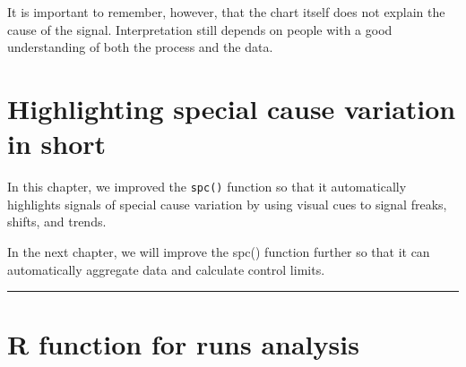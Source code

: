 \documentclass[
]{book}
\begin{document}
It is important to remember, however, that the chart itself does not
explain the cause of the signal. Interpretation still depends on people
with a good understanding of both the process and the data.

\section{Highlighting special cause variation in
short}\label{highlighting-special-cause-variation-in-short}

In this chapter, we improved the \texttt{spc()} function so that it
automatically highlights signals of special cause variation by using
visual cues to signal freaks, shifts, and trends.

In the next chapter, we will improve the spc() function further so that
it can automatically aggregate data and calculate control limits.

\begin{center}\rule{0.5\linewidth}{0.5pt}\end{center}

\section*{R function for runs
analysis}\label{r-function-for-runs-analysis}
\end{document}
